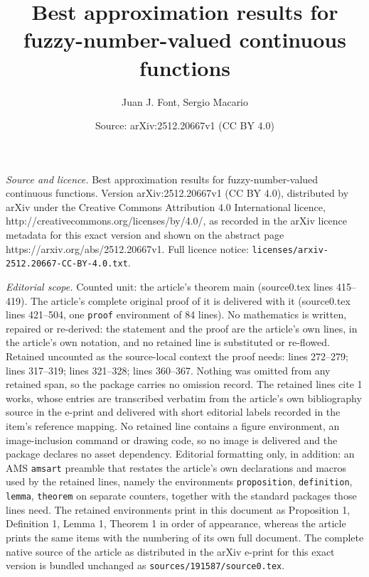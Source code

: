 \documentclass[10pt,a4paper]{amsart}
\title{Best approximation results for fuzzy-number-valued continuous functions}
\author{Juan J. Font, Sergio Macario}
\date{Source: arXiv:2512.20667v1 (CC BY 4.0)}
\begin{document}
\maketitle

\noindent\emph{Source and licence.} Best approximation results for fuzzy-number-valued continuous functions. Version arXiv:2512.20667v1 (CC BY 4.0), distributed by arXiv under the Creative Commons Attribution 4.0 International licence, http://creativecommons.org/licenses/by/4.0/, as recorded in the arXiv licence metadata for this exact version and shown on the abstract page https://arxiv.org/abs/2512.20667v1. Full licence notice: \texttt{licenses/arxiv-2512.20667-CC-BY-4.0.txt}.\par\smallskip

\noindent\textit{Editorial scope.} Counted unit: the article's theorem main (source0.tex lines 415--419). The article's complete original proof of it is delivered with it (source0.tex lines 421--504, one \texttt{proof} environment of 84 lines). No mathematics is written, repaired or re-derived: the statement and the proof are the article's own lines, in the article's own notation, and no retained line is substituted or re-flowed.  Retained uncounted as the source-local context the proof needs: lines 272--279; lines 317--319; lines 321--328; lines 360--367.  Nothing was omitted from any retained span, so the package carries no omission record.  The retained lines cite 1 works, whose entries are transcribed verbatim from the article's own bibliography source in the e-print and delivered with short editorial labels recorded in the item's reference mapping.  No retained line contains a figure environment, an image-inclusion command or drawing code, so no image is delivered and the package declares no asset dependency.  Editorial formatting only, in addition: an AMS \texttt{amsart} preamble that restates the article's own declarations and macros used by the retained lines, namely the environments \texttt{proposition}, \texttt{definition}, \texttt{lemma}, \texttt{theorem} on separate counters, together with the standard packages those lines need.  The retained environments print in this document as Proposition 1, Definition 1, Lemma 1, Theorem 1 in order of appearance, whereas the article prints the same items with the numbering of its own full document.  The complete native source of the article as distributed in the arXiv e-print for this exact version is bundled unchanged as \texttt{sources/191587/source0.tex}.
\end{document}
